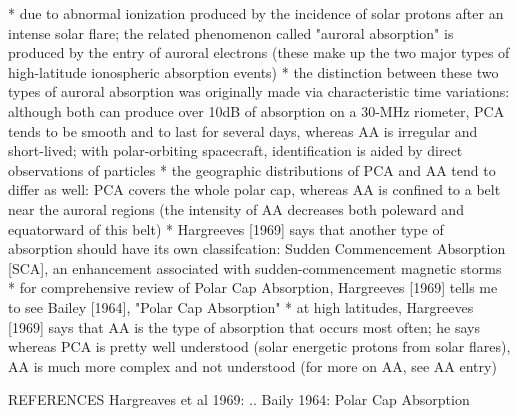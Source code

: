 
* due to abnormal ionization produced by the incidence of solar protons 
after an intense solar flare; the related phenomenon called "auroral absorption" 
is produced by the entry of auroral electrons (these make up the two
major types of high-latitude ionospheric absorption events)
* the distinction between these two types of auroral absorption was
originally made via characteristic time variations: although both can
produce over 10dB of absorption on a 30-MHz riometer, PCA tends to be
smooth and to last for several days, whereas AA is irregular and
short-lived; with polar-orbiting spacecraft, identification is aided by
direct observations of particles
* the geographic distributions of PCA and AA tend to differ as well: PCA
covers the whole polar cap, whereas AA is confined to a belt near the
auroral regions (the intensity of AA decreases both poleward and
equatorward of this belt)
* Hargreeves [1969] says that another type of absorption should have its
own classifcation: Sudden Commencement Absorption [SCA], an enhancement
associated with sudden-commencement magnetic storms
* for comprehensive review of Polar Cap Absorption, Hargreeves [1969]
tells me to see Bailey [1964], "Polar Cap Absorption"
* at high latitudes, Hargreeves [1969] says that AA is the type of
absorption that occurs most often; he says whereas PCA is pretty well
understood (solar energetic protons from solar flares), AA is much more complex
and not understood  (for more on AA, see AA entry)



REFERENCES
Hargreaves et al 1969: ..
Baily 1964: Polar Cap Absorption
